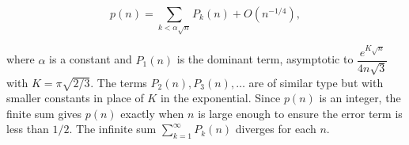 $$p(n) = \sum_{k < \alpha\sqrt{n}} P_k(n) + O(n^{-1/4}),$$

where $\alpha$ is a constant and $P_1(n)$ is the dominant term, asymptotic to $\dfrac{e^{K\sqrt{n}}}{4n\sqrt{3}}$ with $K = \pi\sqrt{2/3}$. The terms $P_2(n), P_3(n), \ldots$ are of similar type but with smaller constants in place of $K$ in the exponential. Since $p(n)$ is an integer, the finite sum gives $p(n)$ exactly when $n$ is large enough to ensure the error term is less than $1/2$. The infinite sum $\sum_{k=1}^{\infty} P_k(n)$ diverges for each $n$.
